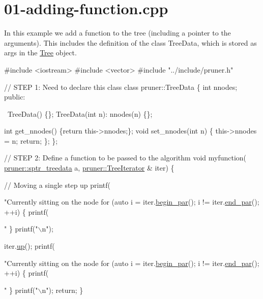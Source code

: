 \hypertarget{01-adding-function_8cpp-example}{}\section{01-\/adding-\/function.\+cpp}
In this example we add a function to the tree (including a pointer to the arguments). This includes the definition of the class Tree\+Data, which is stored as args in the \hyperlink{classTree}{Tree} object.


\begin{DoxyCodeInclude}
\textcolor{preprocessor}{#include <iostream>}
\textcolor{preprocessor}{#include <vector>}
\textcolor{preprocessor}{#include "../include/pruner.h"}

\textcolor{comment}{// STEP 1: Need to declare this class}
\textcolor{keyword}{class }pruner::TreeData \{
  \textcolor{keywordtype}{int} nnodes;
\textcolor{keyword}{public}:
  
  ~TreeData() \{\};
  TreeData(\textcolor{keywordtype}{int} n): nnodes(n) \{\};
  
  \textcolor{keywordtype}{int} get\_nnodes() \{\textcolor{keywordflow}{return} this->nnodes;\};
  \textcolor{keywordtype}{void} set\_nnodes(\textcolor{keywordtype}{int} n) \{
    this->nnodes = n;
    \textcolor{keywordflow}{return};
  \};
\};

\textcolor{comment}{// STEP 2: Define a function to be passed to the algorithm}
\textcolor{keywordtype}{void} myfunction(
    \hyperlink{namespacepruner_a533476fef17527e75c4fba71d8c4ce50}{pruner::sptr\_treedata} a,
    \hyperlink{classpruner_1_1TreeIterator}{pruner::TreeIterator} & iter) \{
  
  \textcolor{comment}{// Moving a single step up}
  printf(\textcolor{stringliteral}{"Currently sitting on the node %
  \textcolor{keywordflow}{for} (\textcolor{keyword}{auto} i = iter.\hyperlink{classpruner_1_1TreeIterator_a3cb8dd28630f065472e135f7db822abf}{begin\_par}(); i != iter.\hyperlink{classpruner_1_1TreeIterator_aac5656fc5b550cb8dfa4a9ebd5ea910a}{end\_par}(); ++i) \{
    printf(\textcolor{stringliteral}{" %
  \}
  printf(\textcolor{stringliteral}{"\(\backslash\)n"});
  
  iter.\hyperlink{classpruner_1_1TreeIterator_adca1d999f093a69e2f5d044b358e5da7}{up}();
  printf(\textcolor{stringliteral}{"Currently sitting on the node %
  \textcolor{keywordflow}{for} (\textcolor{keyword}{auto} i = iter.\hyperlink{classpruner_1_1TreeIterator_a3cb8dd28630f065472e135f7db822abf}{begin\_par}(); i != iter.\hyperlink{classpruner_1_1TreeIterator_aac5656fc5b550cb8dfa4a9ebd5ea910a}{end\_par}(); ++i) \{
    printf(\textcolor{stringliteral}{" %
  \}
  printf(\textcolor{stringliteral}{"\(\backslash\)n"});
  \textcolor{keywordflow}{return};
\}

}}}}
\end{DoxyCodeInclude}
